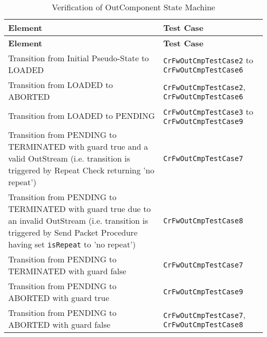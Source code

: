 \documentclass{pnp_article}
\begin{document}
\begin{longtable}{|>{\raggedright}p{8.0cm}|P{5.0cm}|}
\caption{Verification of OutComponent State Machine}
\label{tab:verOutComponentSM}\\
\hline
{}
\textbf{Element} & \textbf{Test Case} \\
\hline
\endfirsthead
{}
\textbf{Element} & \textbf{Test Case} \\
\hline
\endhead
Transition from Initial Pseudo-State to LOADED  & \texttt{CrFwOutCmpTestCase2} to \texttt{CrFwOutCmpTestCase6}\\
\hline
Transition from LOADED to ABORTED  & \texttt{CrFwOutCmpTestCase2}, \texttt{CrFwOutCmpTestCase6}\\
\hline
Transition from LOADED to PENDING  & \texttt{CrFwOutCmpTestCase3} to \texttt{CrFwOutCmpTestCase9}\\
\hline
Transition from PENDING to TERMINATED with guard true and a valid OutStream (i.e. transition is triggered by Repeat Check returning 'no repeat') & \texttt{CrFwOutCmpTestCase7}\\
\hline
Transition from PENDING to TERMINATED with guard true due to an invalid OutStream (i.e. transition is triggered by Send Packet Procedure having set \texttt{isRepeat} to 'no repeat') & \texttt{CrFwOutCmpTestCase8}\\
\hline
Transition from PENDING to TERMINATED with guard false & \texttt{CrFwOutCmpTestCase7}\\
\hline
Transition from PENDING to ABORTED with guard true & \texttt{CrFwOutCmpTestCase9}\\
\hline
Transition from PENDING to ABORTED with guard false & \texttt{CrFwOutCmpTestCase7}, \texttt{CrFwOutCmpTestCase8}\\
\hline
\end{longtable}
\end{document}
